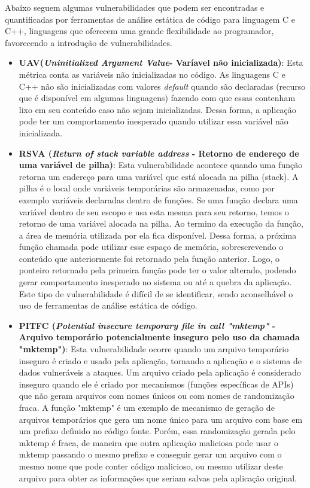 %
Abaixo seguem algumas vulnerabilidades que podem ser encontradas e quantificadas por ferramentas de análise estática de código para linguagem C e C++, linguagens que oferecem uma grande flexibilidade ao programador, favorecendo a introdução de vulnerabilidades.

\begin{itemize}

\item \textbf{UAV(\emph{Uninitialized Argument Value}- Varíavel não inicializada)}:
%
Esta métrica conta as variáveis não inicializadas no código. As linguagens C e C++ não são inicializadas com valores \emph{default} quando são declaradas (recurso que é disponível em algumas linguagens) fazendo com que essas contenham lixo em seu conteúdo caso não sejam inicializadas. Dessa forma, a aplicação pode ter um comportamento inesperado quando utilizar essa variável não inicializada.

\item \textbf{ RSVA (\emph{Return of stack variable address} - Retorno de endereço de uma variável de pilha)}:
%
Esta vulnerabilidade acontece quando uma função retorna um endereço para uma variável que está alocada na pilha (stack). A pilha é o local onde variáveis temporárias são armazenadas, como por exemplo variáveis declaradas dentro de funções. Se uma função declara uma variável dentro de seu escopo e usa esta mesma para seu retorno, temos o retorno de uma variável alocada na pilha. Ao termino da execução da função, a área de memória utilizada por ela fica disponível. Dessa forma, a próxima função chamada pode utilizar esse espaço de memória, sobrescrevendo o conteúdo que anteriormente foi retornado pela função anterior. Logo, o ponteiro retornado pela primeira função pode ter o valor alterado, podendo gerar comportamento inesperado no sistema ou até a quebra da aplicação. Este tipo de vulnerabilidade é difícil de se identificar, sendo aconselhável o uso de ferramentas de análise estática de código.

\item \textbf{PITFC (\emph{Potential insecure temporary file in call "mktemp" } - Arquivo temporário potencialmente inseguro pelo uso da chamada "mktemp")}:
%
Esta vulnerabilidade ocorre quando um arquivo temporário inseguro é criado e usado pela aplicação, tornando a aplicação e o sistema de dados vulneráveis a ataques. Um arquivo criado pela aplicação é considerado inseguro quando ele é criado por mecanismos (funções específicas de APIs) que não geram arquivos com nomes únicos ou com nomes de randomização fraca. A função "mktemp" é um exemplo de mecanismo de geração de arquivos temporários que gera um nome único para um arquivo com base em um prefixo definido no código fonte. Porém, essa randomização gerada pelo mktemp é fraca, de maneira que outra aplicação maliciosa pode usar o mktemp passando o mesmo prefixo e conseguir gerar um arquivo com o mesmo nome que pode conter código malicioso, ou mesmo utilizar deste arquivo para obter as informações que seriam salvas pela aplicação original.


\end{itemize}

